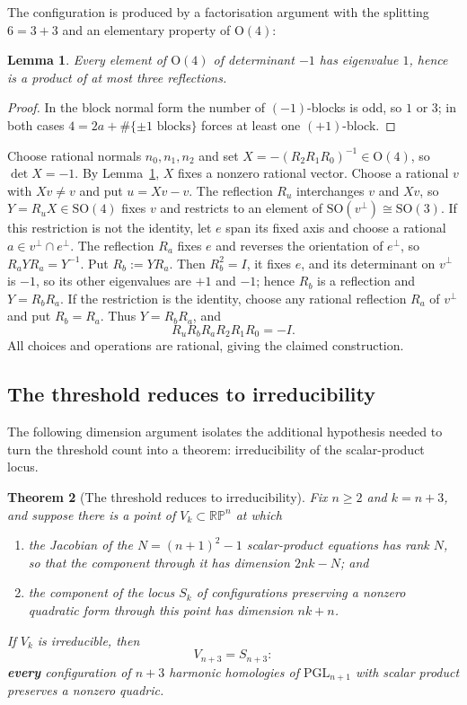 \documentclass[11pt,a4paper]{article}
\theoremstyle{plain}
\newtheorem{theorem}{Theorem}[section]
\newtheorem{lemma}[theorem]{Lemma}
\theoremstyle{definition}
\theoremstyle{remark}
\newcommand{\PGL}{\mathrm{PGL}}
\begin{document}
The configuration is produced by a factorisation argument with the splitting
$6=3+3$ and an elementary property of $\mathrm{O}(4)$:

\begin{lemma}\label{lem:o4}
Every element of $\mathrm{O}(4)$ of determinant $-1$ has eigenvalue $1$, hence is a
product of at most three reflections.
\end{lemma}

\begin{proof}
In the block normal form the number of $(-1)$-blocks is odd, so $1$ or $3$; in both
cases $4=2a+\#\{\pm1\text{ blocks}\}$ forces at least one $(+1)$-block.
\end{proof}

Choose rational normals $n_0,n_1,n_2$ and set
$X=-(R_2R_1R_0)^{-1}\in\mathrm O(4)$, so $\det X=-1$. By Lemma~\ref{lem:o4},
$X$ fixes a nonzero rational vector. Choose a rational $v$ with $Xv\ne v$ and put
$u=Xv-v$. The reflection $R_u$ interchanges $v$ and $Xv$, so
$Y=R_uX\in\mathrm{SO}(4)$ fixes $v$ and restricts to an element of
$\mathrm{SO}(v^\perp)\cong\mathrm{SO}(3)$. If this restriction is not the
identity, let $e$ span its fixed axis and choose a rational
$a\in v^\perp\cap e^\perp$. The reflection $R_a$ fixes $e$ and reverses the
orientation of $e^\perp$, so $R_aYR_a=Y^{-1}$. Put $R_b:=YR_a$. Then $R_b^2=I$,
it fixes $e$, and its determinant on $v^\perp$ is $-1$, so its other eigenvalues
are $+1$ and $-1$; hence $R_b$ is a reflection and $Y=R_bR_a$. If the restriction is
the identity, choose any rational reflection $R_a$ of $v^\perp$ and put
$R_b=R_a$. Thus $Y=R_bR_a$, and
\[
              R_uR_bR_aR_2R_1R_0=-I.
\]
All choices and operations are rational, giving the claimed construction.

\subsection{The threshold reduces to irreducibility}

The following dimension argument isolates the additional hypothesis needed to turn
the threshold count into a theorem: irreducibility of the scalar-product locus.

\begin{theorem}[The threshold reduces to irreducibility]\label{thm:reduction}
Fix $n\ge2$ and $k=n+3$, and suppose there is a point of $V_k\subset\mathbb{RP}^n$
at which
\begin{enumerate}[label=\textup{(\alph*)},nosep]
  \item the Jacobian of the $N=(n+1)^2-1$ scalar-product equations has rank $N$, so
        that the component through it has dimension $2nk-N$; and
  \item the component of the locus $S_k$ of configurations preserving a nonzero
        quadratic form through this point has dimension $nk+n$.
\end{enumerate}
If $V_k$ is irreducible, then
\[
  V_{n+3}=S_{n+3} :
\]
\textbf{every} configuration of $n+3$ harmonic homologies of $\PGL_{n+1}$ with
scalar product preserves a nonzero quadric.
\end{theorem}
\end{document}
